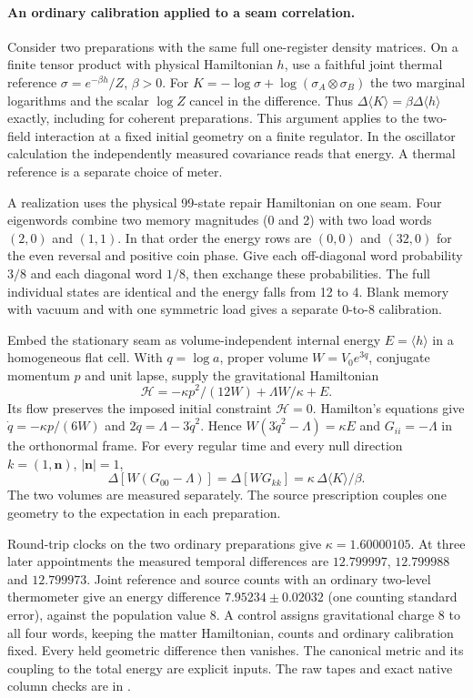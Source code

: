 \documentclass[11pt]{article}
\begin{document}
\paragraph{An ordinary calibration applied to a seam correlation.}
\label{par:seam-gibbs-curvature}
Consider two preparations with the same full one-register density
matrices. On a finite tensor product with physical Hamiltonian $h$, use
a faithful joint thermal reference $\sigma=e^{-\beta h}/Z$, $\beta>0$.
For $K=-\log\sigma+\log(\sigma_A\otimes\sigma_B)$ the two marginal
logarithms and the scalar $\log Z$ cancel in the difference. Thus
$\Delta\langle K\rangle=\beta\Delta\langle h\rangle$ exactly, including
for coherent preparations. This argument applies to the two-field
interaction at a fixed initial geometry on a finite regulator. In the
oscillator calculation the independently measured covariance reads that
energy. A thermal reference is a separate choice of meter.

A realization uses the physical 99-state repair Hamiltonian on one
seam. Four eigenwords combine two memory magnitudes (0 and 2) with
two load words $(2,0)$ and $(1,1)$. In that order the energy rows are
$(0,0)$ and $(32,0)$ for the even reversal and positive coin phase.
Give each off-diagonal word probability $3/8$ and each diagonal word
$1/8$, then exchange these probabilities. The full individual states
are identical and the energy falls from 12 to 4. Blank memory with
vacuum and with one symmetric load gives a separate 0-to-8 calibration.

Embed the stationary seam as volume-independent internal energy
$E=\langle h\rangle$ in a homogeneous flat cell. With $q=\log a$,
proper volume $W=V_0e^{3q}$, conjugate momentum $p$ and unit lapse,
supply the gravitational Hamiltonian
\[
 \mathcal H=-\kappa p^2/(12W)+\Lambda W/\kappa+E .
\]
Its flow preserves the imposed initial constraint $\mathcal H=0$.
Hamilton's equations give $\dot q=-\kappa p/(6W)$ and
$2\ddot q=\Lambda-3\dot q^2$. Hence $W(3\dot q^2-\Lambda)=\kappa E$
and $G_{ii}=-\Lambda$ in the orthonormal frame. For every regular
time and every null direction $k=(1,\mathbf n)$, $|\mathbf n|=1$,
\[
 \Delta[W(G_{00}-\Lambda)]=\Delta[W G_{kk}]
 =\kappa\,\Delta\langle K\rangle/\beta .
\]
The two volumes are measured separately. The source prescription couples
one geometry to the expectation in each preparation.

Round-trip clocks on the two ordinary preparations give
$\kappa=1.60000105$. At three later appointments the measured temporal
differences are $12.799997$, $12.799988$ and $12.799973$. Joint
reference and source counts with an ordinary two-level thermometer give
an energy difference $7.95234\pm0.02032$ (one counting standard error),
against the population value 8. A control assigns gravitational charge
8 to all four words, keeping the matter Hamiltonian, counts and
ordinary calibration fixed. Every held geometric difference then
vanishes. The canonical metric and its coupling to the total energy
are explicit inputs. The raw tapes and exact native column checks
are in .
\end{document}
